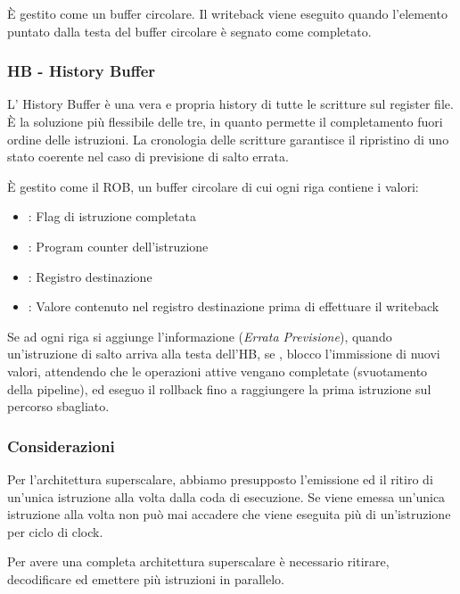 \documentclass[../template]{subfiles}
\begin{document}
È gestito come un buffer circolare. Il writeback viene eseguito quando l'elemento puntato dalla testa del buffer
circolare è segnato come completato.

\subsubsection{HB - History Buffer}
L' History Buffer è una vera e propria history di tutte le scritture sul register file.
È la soluzione più flessibile delle tre, in quanto permette il completamento fuori ordine delle istruzioni. La cronologia delle scritture garantisce il ripristino di uno stato coerente nel caso di previsione di salto errata.

È gestito come il ROB, un buffer circolare di cui ogni riga contiene i valori:
\begin{itemize}
    \item {}: Flag di istruzione completata
    \item {}: Program counter dell'istruzione
    \item {}: Registro destinazione
    \item {}: Valore contenuto nel registro destinazione prima di effettuare il writeback
\end{itemize}

Se ad ogni riga si aggiunge l'informazione  (\textit{Errata Previsione}), quando un'istruzione di salto arriva alla testa dell'HB, se , blocco l'immissione di nuovi valori, attendendo che le operazioni attive vengano completate (svuotamento della pipeline), ed eseguo il rollback fino a raggiungere la prima istruzione sul percorso sbagliato.


\subsubsection{Considerazioni}
Per l'architettura superscalare, abbiamo presupposto l'emissione ed il ritiro di un'unica istruzione alla volta dalla coda di esecuzione.
Se viene emessa un'unica istruzione alla volta non può mai accadere che viene eseguita più di un'istruzione per ciclo di clock.

Per avere una completa architettura superscalare è necessario ritirare, decodificare ed emettere più istruzioni in parallelo.
\end{document}
